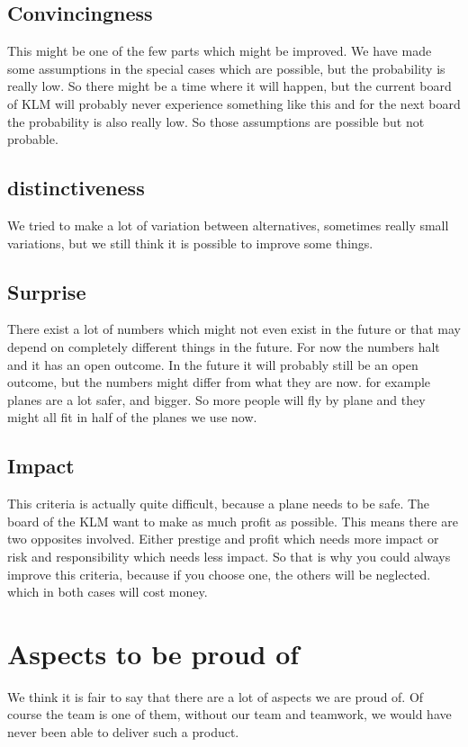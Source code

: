\documentclass[a4paper, 11pt, notitlepage]{report}
\begin{document}
\section{Convincingness}
    This might be one of the few parts which might be improved. We have made some assumptions in the special cases which are possible, but the probability is really low. So there might be a time where it will happen, but the current board of KLM will probably never experience something like this and for the next board the probability is also really low. So those assumptions are possible but not probable.
\section{distinctiveness}
    We tried to make a lot of variation between alternatives, sometimes really small variations, but we still think it is possible to improve some things.
\section{Surprise}
    There exist a lot of numbers which might not even exist in the future or that may depend on completely different things in the future. For now the numbers halt and it has an open outcome. In the future it will probably still be an open outcome, but the numbers might differ from what they are now. for example planes are a lot safer, and bigger. So more people will fly by plane and they might all fit in half of the planes we use now.
\section{Impact}
    This criteria is actually quite difficult, because a plane needs to be safe. The board of the KLM want to make as much profit as possible. This means there are two opposites involved. Either prestige and profit which needs more impact or risk and responsibility which needs less impact. So that is why you could always improve this criteria, because if you choose one, the others will be neglected. which in both cases will cost money.
	
\chapter{Aspects to be proud of}
	We think it is fair to say that there are a lot of aspects we are proud of. Of course the team is one of them, without our team and teamwork, we would have never been able to deliver such a product.
	
\end{document}
